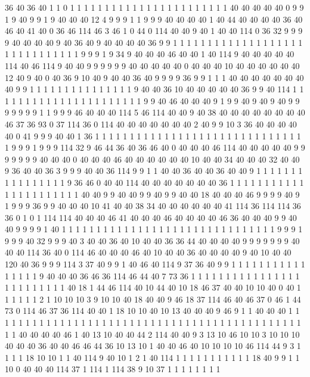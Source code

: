 36 40 36 40 1 1 0 1 1 1 1 1 1 1 1 1 1 1 1 1
1 1 1 1 1 1 1 1 1 1 40 40 40 40 40 0 9 9 1 9
40 9 9 1 9 40 40 40 12 4 9 9 9 1 1 9 9 9 40 40
40 40 1 40 44 40 40 40 40 36 40 46 40 41 40 0 36 46 114 46
3 46 1 0 44 0 114 40 40 9 40 1 40 40 114 0 36 32 9 9
9 9 40 40 40 40 9 40 36 40 9 40 40 40 40 36 9 9 1 1
1 1 1 1 1 1 1 1 1 1 1 1 1 1 1 1 1 1 1 1
1 1 1 1 1 1 1 1 9 9 9 1 9 34 9 40 40 40 46 40
40 1 40 114 9 40 40 40 40 40 114 40 46 114 9 40 40 9 9 9
9 9 9 40 40 40 40 40 0 40 40 40 10 40 40 40 40 40 40 12
40 9 40 0 40 36 9 10 40 9 40 40 36 40 9 9 9 9 36 9
9 1 1 1 40 40 40 40 40 40 40 40 9 9 1 1 1 1 1 1
1 1 1 1 1 1 1 1 1 9 40 40 36 10 40 40 40 40 40 36
9 9 40 114 1 1 1 1 1 1 1 1 1 1 1 1 1 1 1 1
1 1 1 1 1 1 9 9 40 46 40 40 40 9 1 9 9 40 9 40
9 40 9 9 9 9 9 9 9 1 1 9 9 9 46 40 40 40 114 5
46 114 40 40 9 40 38 40 40 40 40 40 40 40 40 46 37 36 93 0
37 114 36 0 114 40 40 40 40 40 40 40 2 40 9 9 10 3 36 40
40 40 40 40 0 41 9 9 9 40 40 1 36 1 1 1 1 1 1 1
1 1 1 1 1 1 1 1 1 1 1 1 1 1 1 1 1 1 1 1
1 1 1 1 9 9 9 1 9 9 9 114 32 9 46 44 36 40 36 46
40 0 40 40 40 46 114 40 40 40 40 40 9 9 9 9 9 9 9 40
40 40 0 40 40 40 46 40 40 40 40 40 40 10 40 40 34 40 40 40
32 40 40 9 36 40 40 36 3 9 9 9 40 40 36 114 9 9 1 1
40 40 36 40 40 36 40 40 9 1 1 1 1 1 1 1 1 1 1 1
1 1 1 1 1 9 36 46 0 40 40 114 40 40 40 40 40 40 40 36
1 1 1 1 1 1 1 1 1 1 1 1 1 1 1 1 1 1 1 1
1 1 40 40 9 9 40 40 9 9 40 9 9 40 40 18 40 40 40 46
9 9 9 9 40 9 1 9 9 9 36 9 9 40 40 40 10 41 40 40
38 34 40 40 40 40 40 40 41 114 36 114 114 36 36 0 1 0 1 114
114 40 40 40 46 41 40 40 40 46 40 40 40 40 46 36 40 40 40 9
9 40 40 9 9 9 9 1 40 1 1 1 1 1 1 1 1 1 1 1
1 1 1 1 1 1 1 1 1 1 1 1 1 1 1 1 1 1 1 1
9 9 9 1 9 9 9 40 32 9 9 9 40 3 40 40 36 40 10 40
40 36 36 44 40 40 40 40 9 9 9 9 9 9 9 40 40 40 114 36
40 0 114 46 40 40 40 46 40 10 40 40 36 40 40 40 40 9 40 10
40 40 120 40 36 9 9 9 114 3 37 40 9 9 1 40 46 40 114 9
37 36 40 9 9 1 1 1 1 1 1 1 1 1 1 1 1 1 1 1
1 9 40 40 40 36 46 36 114 46 44 40 7 73 36 1 1 1 1 1
1 1 1 1 1 1 1 1 1 1 1 1 1 1 1 1 1 1 1 1
40 18 1 44 46 114 40 10 44 40 10 18 46 37 40 40 10 10 40 0
40 1 1 1 1 1 1 2 1 10 10 10 3 9 10 10 40 18 40 40
9 46 18 37 114 46 40 46 37 0 46 1 44 73 0 114 46 37 36 114
40 40 1 18 10 10 40 10 13 40 40 40 9 46 9 1 1 40 40 40
1 1 1 1 1 1 1 1 1 1 1 1 1 1 1 1 1 1 1 1
1 1 1 1 1 1 1 1 1 1 1 1 1 1 1 1 1 1 1 1
1 1 1 1 1 1 1 40 40 40 40 46 1 40 13 10 40 40 44 2
114 40 40 9 3 13 10 46 10 10 3 10 10 10 40 40 40 36 40 40
46 46 44 36 10 13 10 1 40 40 46 40 10 10 10 10 46 114 44 9
3 1 1 1 1 18 10 10 1 1 40 114 9 40 10 1 2 1 40 114
1 1 1 1 1 1 1 1 1 1 1 18 40 9 9 1 1 10 0 40
40 40 114 37 1 114 1 114 38 9 10 37 1 1 1 1 1 1 1 1
